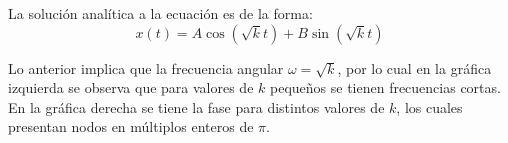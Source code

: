 \documentclass[paper=letter, fontsize=11pt]{scrartcl}
\begin{document}
La soluci\'on anal\'itica a la ecuaci\'on es de la forma:
\begin{equation}
	x(t) = A\cos\left(\sqrt{k}t\right) + B\sin\left(\sqrt{k}t\right)
\end{equation}

Lo anterior implica que la frecuencia angular $\omega = \sqrt{k}$, por lo cual en la gr\'afica izquierda se observa que para valores de $k$ peque\~nos se tienen frecuencias cortas. En la gr\'afica derecha se tiene la fase para distintos valores de $k$, los cuales presentan nodos en m\'ultiplos enteros de $\pi$.
\end{document}
